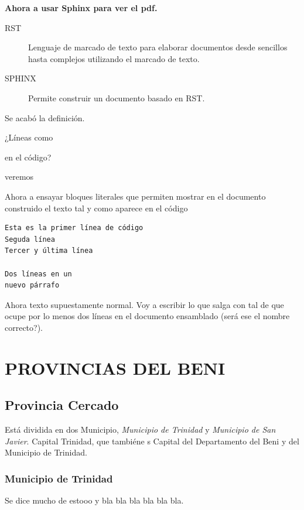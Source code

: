 \documentclass[letterpaper,10pt,english]{sphinxmanual}
\begin{document}
\textbf{Ahora a usar Sphinx para ver el pdf.}
\begin{description}
\item[{RST}] \leavevmode
Lenguaje de marcado de texto para elaborar documentos desde sencillos hasta complejos utilizando el marcado de texto.

\item[{SPHINX}] \leavevmode
Permite construir un documento basado en RST.

\end{description}

Se acabó la definición.

\begin{DUlineblock}{0em}
\item[] ¿Líneas como
\item[] en el código?
\item[] veremos
\end{DUlineblock}

Ahora a ensayar bloques literales que permiten mostrar en el documento construido el texto tal y como aparece en el código

\begin{Verbatim}[commandchars=\\\{\}]
Esta es la primer línea de código
Seguda línea
Tercer y última línea

Dos líneas en un
nuevo párrafo
\end{Verbatim}

Ahora texto supuestamente normal. Voy a escribir lo que salga con tal de que ocupe por lo menos dos líneas en el documento
ensamblado (será ese el nombre correcto?).


\part{PROVINCIAS DEL BENI}
\label{provincias::doc}\label{provincias:provincias-del-beni}\label{provincias:provincias}

\chapter{Provincia Cercado}
\label{cercado::doc}\label{cercado:provincia-cercado}\label{cercado:cercado}
Está dividida en dos Municipio, \emph{Municipio de Trinidad} y \emph{Municipio de San Javier}.
Capital Trinidad, que tambiéne s Capital del Departamento del Beni y del Municipio de Trinidad.


\section{Municipio de Trinidad}
\label{cercado:municipio-de-trinidad}\label{cercado:mun-trinidad}
Se dice mucho de estooo  y bla bla bla bla bla bla.
\end{document}
